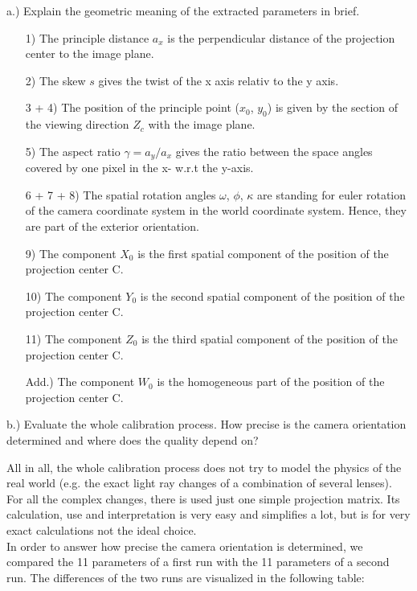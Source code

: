 \documentclass[a4paper,headings=small]{scrartcl}
\numberwithin{equation}{section} %
\numberwithin{figure}{section}   %
\begin{document}
a.) Explain the geometric meaning of the extracted parameters in brief.

\begin{enumerate}
\item[1)] The principle distance $a_x$ is the perpendicular distance of the projection center
to the image plane.
\item[2)] The skew $s$ gives the twist of the x axis relativ to the y axis.
\item[3 + 4)] The position of the principle point ($x_0$, $y_0$) is given by the section of the 
viewing direction $Z_c$ with the image plane.
\item[5)] The aspect ratio $\gamma=a_y/a_x$ gives the ratio between the space angles covered
by one pixel in the x- w.r.t the y-axis.
\item[6 + 7 + 8)] The spatial rotation angles $\omega$, $\phi$, $\kappa$ are standing for euler rotation of the camera coordinate system in the
world coordinate system. Hence, they are part of the exterior orientation.
\item[9)] The component $X_0$ is the first spatial component of the position of the projection center C.\\
\item[10)] The component $Y_0$ is the second spatial component of the position of the projection center C.\\
\item[11)] The component $Z_0$ is the third spatial component of the position of the projection center C.\\
\item[Add.)] The component $W_0$ is the homogeneous part of the position of the projection center C.\\
\end{enumerate} 

b.) Evaluate the whole calibration process. How precise is the camera
orientation determined and where does the quality depend on?

All in all, the whole calibration process does not try to model the physics of the real world
(e.g. the exact light ray changes of a combination of several lenses).
For all the complex changes, there is used just one simple projection matrix.
Its calculation, use and interpretation is very easy and simplifies a lot,
but is for very exact calculations not the ideal choice.\\ 

In order to answer how precise the camera orientation is determined,
we compared the 11 parameters of a first run with the 11 parameters of a second run.
The differences of the two runs are visualized in the following table:
\end{document}
